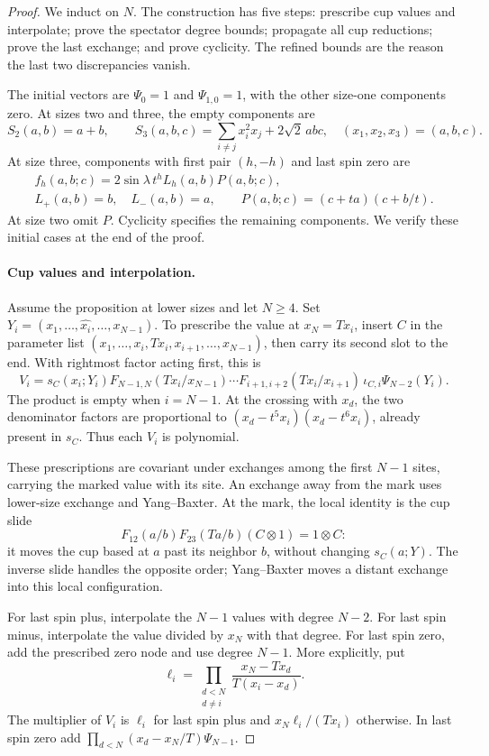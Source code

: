 \begin{proof}
We induct on \(N\). The construction has five steps: prescribe cup
values and interpolate; prove the spectator degree bounds; propagate
all cup reductions; prove the last exchange; and prove cyclicity.
The refined bounds are the reason the last two discrepancies vanish.

The initial vectors are \(\Psi_0=1\) and \(\Psi_{1,0}=1\), with
the other size-one components zero. At sizes two and three, the empty
components are
\[
 S_2(a,b)=a+b,\qquad
 S_3(a,b,c)=\sum_{i\ne j}x_i^2x_j+2\sqrt2\,abc,
 \quad (x_1,x_2,x_3)=(a,b,c).
\]
At size three, components with first pair \((h,-h)\) and last spin
zero are
\[
\begin{gathered}
 f_h(a,b;c)=2\sin\lambda\,t^h L_h(a,b)P(a,b;c),\\
 L_+(a,b)=b,\quad L_-(a,b)=a,\qquad
 P(a,b;c)=(c+ta)(c+b/t).
\end{gathered}
\]
At size two omit \(P\). Cyclicity specifies the remaining components.
We verify these initial cases at the end of the proof.

\paragraph{Cup values and interpolation.}
Assume the proposition at lower sizes and let \(N\ge4\). Set
\(Y_i=(x_1,\ldots,\widehat{x_i},\ldots,x_{N-1})\). To prescribe
the value at \(x_N=Tx_i\), insert \(C\) in the parameter list
\((x_1,\ldots,x_i,Tx_i,x_{i+1},\ldots,x_{N-1})\), then carry
its second slot to the end. With rightmost factor acting first, this is
\[
 V_i=s_C(x_i;Y_i)
 F_{N-1,N}(Tx_i/x_{N-1})\cdots
 F_{i+1,i+2}(Tx_i/x_{i+1})\,
 \iota_{C,i}\Psi_{N-2}(Y_i).
\]
The product is empty when \(i=N-1\). At the crossing with \(x_d\),
the two denominator factors are proportional to
\((x_d-t^5x_i)(x_d-t^6x_i)\), already present in \(s_C\).
Thus each \(V_i\) is polynomial.

These prescriptions are covariant under exchanges among the first
\(N-1\) sites, carrying the marked value with its site. An exchange
away from the mark uses lower-size exchange and Yang--Baxter. At the
mark, the local identity is the cup slide
\[
 F_{12}(a/b)F_{23}(Ta/b)(C\otimes1)=1\otimes C:
\]
it moves the cup based at \(a\) past its neighbor \(b\), without
changing \(s_C(a;Y)\). The inverse slide handles the opposite order;
Yang--Baxter moves a distant exchange into this local configuration.

For last spin plus, interpolate the \(N-1\) values with degree
\(N-2\). For last spin minus, interpolate the value divided by
\(x_N\) with that degree. For last spin zero, add the prescribed
zero node and use degree \(N-1\). More explicitly, put
\[
 \ell_i=\prod_{\substack{d<N\\d\ne i}}
 \frac{x_N-Tx_d}{T(x_i-x_d)}.
\]
The multiplier of \(V_i\) is \(\ell_i\) for last spin plus and
\(x_N\ell_i/(Tx_i)\) otherwise. In last spin zero add
\(\prod_{d<N}(x_d-x_N/T)\Psi_{N-1}\).


\end{proof}

